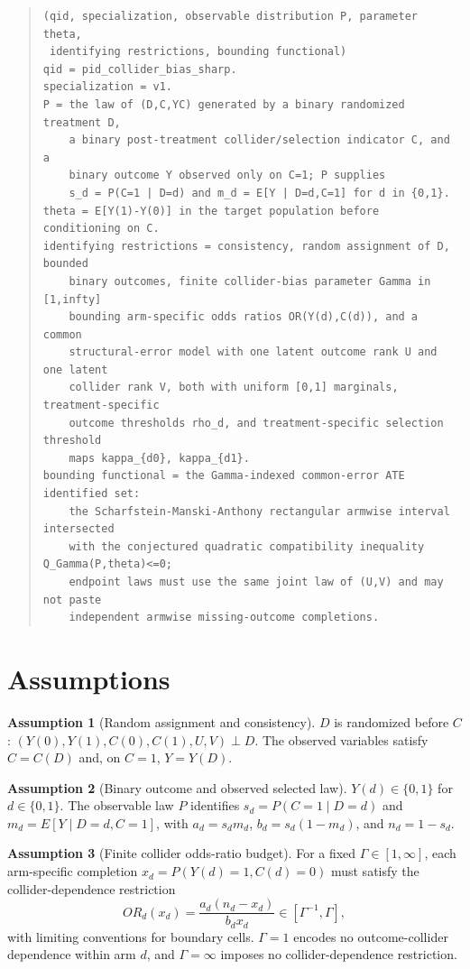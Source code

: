 \documentclass[11pt]{article}
\theoremstyle{definition}
\newtheorem{assumption}{Assumption}
\theoremstyle{plain}
\theoremstyle{remark}
\begin{document}
\begin{quote}
\begin{verbatim}
(qid, specialization, observable distribution P, parameter theta,
 identifying restrictions, bounding functional)
qid = pid_collider_bias_sharp.
specialization = v1.
P = the law of (D,C,YC) generated by a binary randomized treatment D,
    a binary post-treatment collider/selection indicator C, and a
    binary outcome Y observed only on C=1; P supplies
    s_d = P(C=1 | D=d) and m_d = E[Y | D=d,C=1] for d in {0,1}.
theta = E[Y(1)-Y(0)] in the target population before conditioning on C.
identifying restrictions = consistency, random assignment of D, bounded
    binary outcomes, finite collider-bias parameter Gamma in [1,infty]
    bounding arm-specific odds ratios OR(Y(d),C(d)), and a common
    structural-error model with one latent outcome rank U and one latent
    collider rank V, both with uniform [0,1] marginals, treatment-specific
    outcome thresholds rho_d, and treatment-specific selection threshold
    maps kappa_{d0}, kappa_{d1}.
bounding functional = the Gamma-indexed common-error ATE identified set:
    the Scharfstein-Manski-Anthony rectangular armwise interval intersected
    with the conjectured quadratic compatibility inequality Q_Gamma(P,theta)<=0;
    endpoint laws must use the same joint law of (U,V) and may not paste
    independent armwise missing-outcome completions.
\end{verbatim}
\end{quote}

\section{Assumptions}
\begin{assumption}[Random assignment and consistency]\label{ass:random-consistency}
\(D\) is randomized before \(C\): \((Y(0),Y(1),C(0),C(1),U,V)\perp D\).  The observed variables satisfy \(C=C(D)\) and, on \(C=1\), \(Y=Y(D)\).
\end{assumption}

\begin{assumption}[Binary outcome and observed selected law]\label{ass:bounded-observed}
\(Y(d)\in\{0,1\}\) for \(d\in\{0,1\}\).  The observable law \(P\) identifies \(s_d=P(C=1\mid D=d)\) and \(m_d=E[Y\mid D=d,C=1]\), with \(a_d=s_dm_d\), \(b_d=s_d(1-m_d)\), and \(n_d=1-s_d\).
\end{assumption}

\begin{assumption}[Finite collider odds-ratio budget]\label{ass:gamma-or}
For a fixed \(\Gamma\in[1,\infty]\), each arm-specific completion \(x_d=P(Y(d)=1,C(d)=0)\) must satisfy the collider-dependence restriction
\[
  OR_d(x_d)=\frac{a_d(n_d-x_d)}{b_dx_d}\in[\Gamma^{-1},\Gamma],
\]
with limiting conventions for boundary cells.  \(\Gamma=1\) encodes no outcome-collider dependence within arm \(d\), and \(\Gamma=\infty\) imposes no collider-dependence restriction.
\end{assumption}
\end{document}
